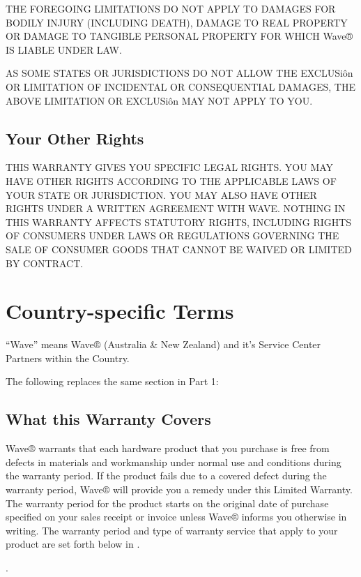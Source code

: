 \documentclass[letterpaper,10pt,english]{sphinxmanual}
\begin{document}
THE FOREGOING LIMITATIONS DO NOT APPLY TO DAMAGES FOR BODILY INJURY (INCLUDING DEATH), DAMAGE TO REAL PROPERTY OR DAMAGE TO TANGIBLE PERSONAL PROPERTY FOR WHICH Wave® IS LIABLE UNDER LAW.

AS SOME STATES OR JURISDICTIONS DO NOT ALLOW THE EXCLUSiôn OR LIMITATION OF INCIDENTAL OR CONSEQUENTIAL DAMAGES, THE ABOVE LIMITATION OR EXCLUSiôn MAY NOT APPLY TO YOU.


\subsection{Your Other Rights}
\label{\detokenize{part1:your-other-rights}}
THIS WARRANTY GIVES YOU SPECIFIC LEGAL RIGHTS. YOU MAY HAVE OTHER RIGHTS ACCORDING TO THE APPLICABLE LAWS OF YOUR STATE OR JURISDICTION. YOU MAY ALSO HAVE OTHER RIGHTS UNDER A WRITTEN AGREEMENT WITH WAVE. NOTHING IN THIS WARRANTY AFFECTS STATUTORY RIGHTS, INCLUDING RIGHTS OF CONSUMERS UNDER LAWS OR REGULATIONS GOVERNING THE SALE OF CONSUMER GOODS THAT CANNOT BE WAIVED OR LIMITED BY CONTRACT.


\section{Country-specific Terms}
\label{\detokenize{part2:country-specific-terms}}\label{\detokenize{part2::doc}}
“Wave” means Wave® (Australia \& New Zealand) and it’s Service Center Partners within the Country.

The following replaces the same section in Part 1:


\subsection{What this Warranty Covers}
\label{\detokenize{part2:what-this-warranty-covers}}
Wave® warrants that each hardware product that you purchase is free from defects in materials and workmanship under normal use and conditions during the warranty period. If the product fails due to a covered defect during the warranty period, Wave® will provide you a remedy under this Limited Warranty. The warranty period for the product starts on the original date of purchase specified on your sales receipt or invoice unless Wave® informs you otherwise in writing. The warranty period and type of warranty service that apply to your product are set forth below in .

.
\end{document}
